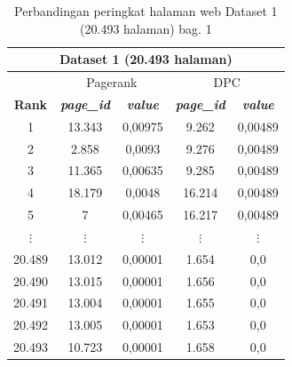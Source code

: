 \begin{longtable}{|c|c|c|c|c|}
	\caption{Perbandingan peringkat halaman web Dataset 1 (20.493 halaman) bag. 1}
	\label{table:rank_comparisson_dataset_1} \\
	\hline
	\multicolumn{5}{|c|}{Dataset 1 (20.493 halaman)} \\
	\hline
	& \multicolumn{2}{c|}{Pagerank} & \multicolumn{2}{c|}{DPC} \\
	\hline
	\textbf{Rank} & \textbf{\textit{page\_id}} & \textbf{\textit{value}} & \textbf{\textit{page\_id}} & \textbf{\textit{value}} \\
	\hline
	1 & 13.343 & 0,00975 & 9.262 & 0,00489 \\
	2 & 2.858 & 0,0093 & 9.276 & 0,00489 \\
	3 & 11.365 & 0,00635 & 9.285 & 0,00489 \\
	4 & 18.179 & 0,0048 & 16.214 & 0,00489 \\
	5 & 7 & 0,00465 & 16.217 & 0,00489 \\
	$\vdots$ & $\vdots$ & $\vdots$ & $\vdots$ & $\vdots$ \\
	20.489 & 13.012 & 0,00001 & 1.654 & 0,0 \\
	20.490 & 13.015 & 0,00001 & 1.656 & 0,0 \\
	20.491 & 13.004 & 0,00001 & 1.655 & 0,0 \\
	20.492 & 13.005 & 0,00001 & 1.653 & 0,0 \\
	20.493 & 10.723 & 0,00001 & 1.658 & 0,0 \\
	\hline
\end{longtable}

